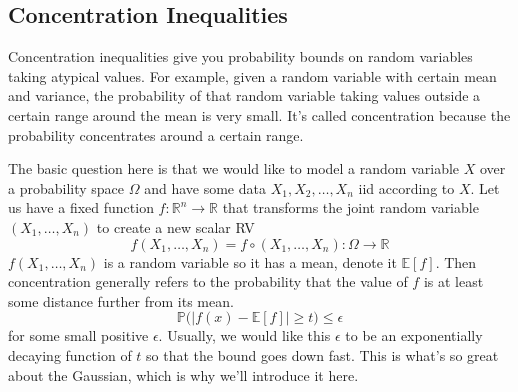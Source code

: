 \documentclass{article}
\begin{document}
  \subsection{Concentration Inequalities}

    Concentration inequalities give you probability bounds on random variables taking atypical values. For example, given a random variable with certain mean and variance, the probability of that random variable taking values outside a certain range around the mean is very small. It's called concentration because the probability concentrates around a certain range. 

    The basic question here is that we would like to model a random variable $X$ over a probability space $\Omega$ and have some data $X_1, X_2, \ldots, X_n$ iid according to $X$. Let us have a fixed function $f: \mathbb{R}^n \longrightarrow \mathbb{R}$ that transforms the joint random variable $(X_1, \ldots, X_n)$ to create a new scalar RV 
    \begin{equation}
      f(X_1, \ldots, X_n) = f \circ (X_1, \ldots, X_n) : \Omega \longrightarrow \mathbb{R}
    \end{equation}
    $f(X_1, \ldots, X_n)$ is a random variable so it has a mean, denote it $\mathbb{E}[f]$. Then concentration generally refers to the probability that the value of $f$ is at least some distance further from its mean. 
    \begin{equation}
      \mathbb{P} \big( |f(x) - \mathbb{E}[f] | \geq t \big) \leq \epsilon
    \end{equation}
    for some small positive $\epsilon$. Usually, we would like this $\epsilon$ to be an exponentially decaying function of $t$ so that the bound goes down fast. This is what's so great about the Gaussian, which is why we'll introduce it here. 
\end{document}
